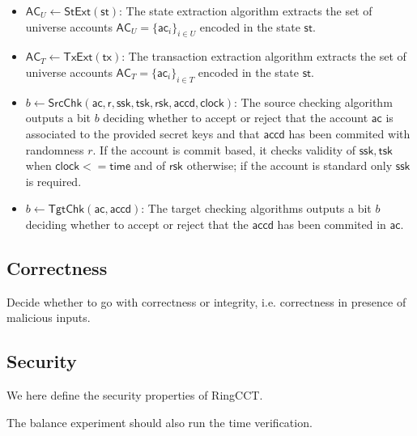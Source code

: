 \begin{definition}
\begin{itemize}
    \item $\mathsf{AC}_U \gets \mathsf{StExt}(\mathsf{st})$: The state extraction algorithm
    extracts the set of universe accounts $\mathsf{AC}_U = \{\mathsf{ac}_i\}_{i \in U}$ encoded in the state $\mathsf{st}$.
    \item $\mathsf{AC}_T \gets \mathsf{TxExt}(\mathsf{tx})$: The transaction extraction algorithm
    extracts the set of universe accounts $\mathsf{AC}_T = \{\mathsf{ac}_i\}_{i \in T}$ encoded in the state $\mathsf{st}$.
    \item $b \gets \mathsf{SrcChk}(\mathsf{ac,r,ssk,tsk,rsk,accd,clock})$: The source checking algorithm outputs a bit $b$ deciding whether to accept or reject that the account $\mathsf{ac}$ is associated to the provided secret keys and that $\mathsf{accd}$ has been commited with randomness $r$. If the account is commit based, it checks validity of $\mathsf{ssk,tsk}$ when $\mathsf{clock} <= \mathsf{time}$ and of $\mathsf{rsk}$ otherwise; if the account is standard only $\mathsf{ssk}$ is required.
    \item $b \gets \mathsf{TgtChk}(\mathsf{ac,accd})$: The target checking algorithms outputs a bit $b$ deciding whether to accept or reject that the $\mathsf{accd}$ has been commited in $\mathsf{ac}$. 
    \end{itemize}
\end{definition}


\subsection{Correctness}

\begin{todobox}
    Decide whether to go with correctness or integrity, i.e. correctness in presence of malicious inputs.    
\end{todobox}


\subsection{Security}
We here define the security properties of RingCCT.

\begin{todobox}
    The balance experiment should also run the time verification.    
\end{todobox}


